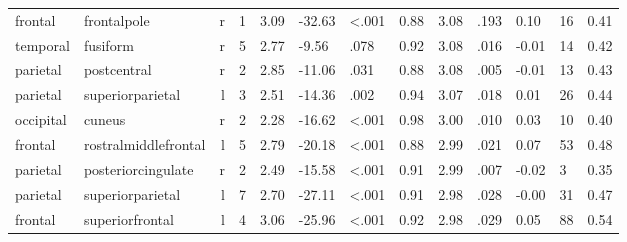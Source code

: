 \documentclass{article}
\begin{document}
\begin{longtable}{llrR{1.3cm}R{1cm}R{1.3cm}R{1cm}R{1cm}R{1.3cm}R{1cm}R{1.8cm}R{1.3cm}R{1.8cm}}
   frontal &               frontalpole &    r &         1 &                  3.09 &           -32.63 &      \textless.001 &                               0.88 &                          3.08 &                            .193 &   0.10 &     16 &      0.41 \\
  temporal &                  fusiform &    r &         5 &                  2.77 &            -9.56 &               .078 &                               0.92 &                          3.08 &                            .016 &  -0.01 &     14 &      0.42 \\
  parietal &               postcentral &    r &         2 &                  2.85 &           -11.06 &               .031 &                               0.88 &                          3.08 &                            .005 &  -0.01 &     13 &      0.43 \\
  parietal &          superiorparietal &    l &         3 &                  2.51 &           -14.36 &               .002 &                               0.94 &                          3.07 &                            .018 &   0.01 &     26 &      0.44 \\
 occipital &                    cuneus &    r &         2 &                  2.28 &           -16.62 &      \textless.001 &                               0.98 &                          3.00 &                            .010 &   0.03 &     10 &      0.40 \\
   frontal &      rostralmiddlefrontal &    l &         5 &                  2.79 &           -20.18 &      \textless.001 &                               0.88 &                          2.99 &                            .021 &   0.07 &     53 &      0.48 \\
  parietal &        posteriorcingulate &    r &         2 &                  2.49 &           -15.58 &      \textless.001 &                               0.91 &                          2.99 &                            .007 &  -0.02 &      3 &      0.35 \\
  parietal &          superiorparietal &    l &         7 &                  2.70 &           -27.11 &      \textless.001 &                               0.91 &                          2.98 &                            .028 &  -0.00 &     31 &      0.47 \\
   frontal &           superiorfrontal &    l &         4 &                  3.06 &           -25.96 &      \textless.001 &                               0.92 &                          2.98 &                            .029 &   0.05 &     88 &      0.54 \\

\end{longtable}
\end{document}

